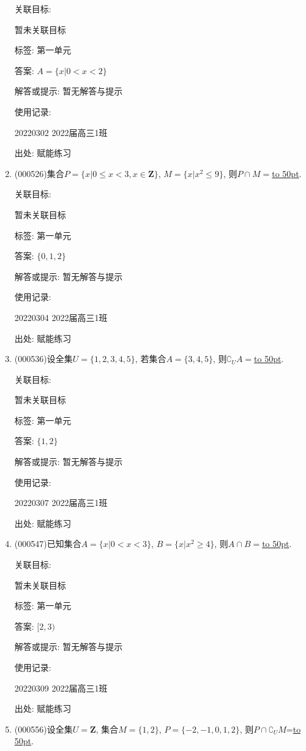 \documentclass[10pt,a4paper]{article}
\newcommand{\blank}[1]{\underline{\hbox to #1pt{}}}
\begin{document}
\begin{enumerate}[1.]
关联目标:

暂未关联目标



标签: 第一单元

答案: $A=\{x|0<x<2\}$

解答或提示: 暂无解答与提示

使用记录:

20220302	2022届高三1班	


出处: 赋能练习
\item { (000526)}集合$P=\{x|0 \le x<3, x\in \mathbf{Z}\}$, $M=\{x|x^2 \le 9\}$, 则$P\cap M=$\blank{50}.


关联目标:

暂未关联目标



标签: 第一单元

答案: $\{ 0,1,2 \}$

解答或提示: 暂无解答与提示

使用记录:

20220304	2022届高三1班	


出处: 赋能练习
\item { (000536)}设全集$U=\{ 1,2,3,4,5\}$, 若集合$A=\{3,4,5\}$, 则$\complement_U A=$\blank{50}.


关联目标:

暂未关联目标



标签: 第一单元

答案: $\{1,2\}$

解答或提示: 暂无解答与提示

使用记录:

20220307	2022届高三1班	


出处: 赋能练习
\item { (000547)}已知集合$A=\{x|0<x<3\}$, $B=\{x|x^2\ge 4\}$, 则$A\cap B=$\blank{50}.


关联目标:

暂未关联目标



标签: 第一单元

答案: $[2,3)$

解答或提示: 暂无解答与提示

使用记录:

20220309	2022届高三1班	


出处: 赋能练习
\item { (000556)}设全集$U=\mathbf{Z}$, 集合$M=\{1,2\}$, $P=\{-2,-1,0,1,2\}$, 则$P\cap \complement_U M$=\blank{50}.



\end{enumerate}
\end{document}
